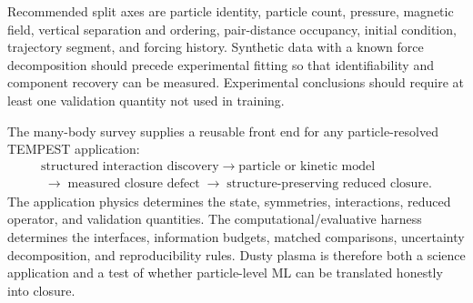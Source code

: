 Recommended split axes are particle identity, particle count, pressure, magnetic field, vertical separation and ordering, pair-distance occupancy, initial condition, trajectory segment, and forcing history. Synthetic data with a known force decomposition should precede experimental fitting so that identifiability and component recovery can be measured. Experimental conclusions should require at least one validation quantity not used in training.

\begin{takeaway}
The many-body survey supplies a reusable front end for any particle-resolved TEMPEST application:
\[
\boxed{
\begin{gathered}
\text{structured interaction discovery}
\;\to\;
\text{particle or kinetic model}
\\[-0.15em]
\;\to\;
\text{measured closure defect}
\;\to\;
\text{structure-preserving reduced closure}.
\end{gathered}
}
\]
The application physics determines the state, symmetries, interactions, reduced operator, and validation quantities. The computational/evaluative harness determines the interfaces, information budgets, matched comparisons, uncertainty decomposition, and reproducibility rules. Dusty plasma is therefore both a science application and a test of whether particle-level ML can be translated honestly into closure.
\end{takeaway}
